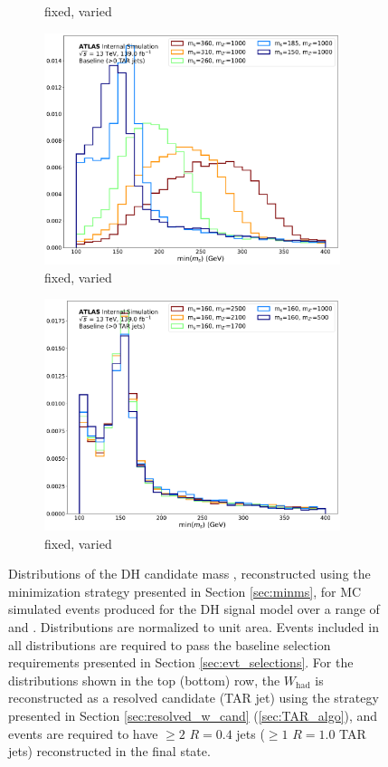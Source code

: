 \begin{figure}[H]
\begin{subfigure}[b]{0.49\textwidth}
	\caption{\ms fixed, \mZp varied}
	\label{fig:minms_res_mZp}
	\end{subfigure}
	\begin{subfigure}[b]{0.49\textwidth}
	\includegraphics[width=0.95\textwidth]{Figures/5/TARJets10_minmS_mgd_ms.pdf}
	\caption{\mZp fixed, \ms varied}
	\label{fig:minms_res_ms}
	\end{subfigure}
	\begin{subfigure}[b]{0.49\textwidth}
	\includegraphics[width=0.95\textwidth]{Figures/5/TARJets10_minmS_mgd_mZp.pdf}
	\caption{\ms fixed, \mZp varied}
	\label{fig:minms_res_mZp}
	\end{subfigure}
	\caption[]{Distributions of the DH candidate mass \minms, reconstructed using the minimization strategy presented in Section \ref{sec:minms}, for MC simulated events produced for the DH signal model over a range of \ms and \mZp. Distributions are normalized to unit area. Events included in all distributions are required to pass the baseline selection requirements presented in Section \ref{sec:evt_selections}. For the distributions shown in the top (bottom) row, the \(W_\text{had}\) is reconstructed as a resolved candidate (TAR jet) using the strategy presented in Section \ref{sec:resolved_w_cand} (\ref{sec:TAR_algo}), and events are required to have \(\geq2\) \(R=0.4\) \smallR jets (\(\geq1\) \(R=1.0\) TAR jets) reconstructed in the final state.}

\end{figure}
